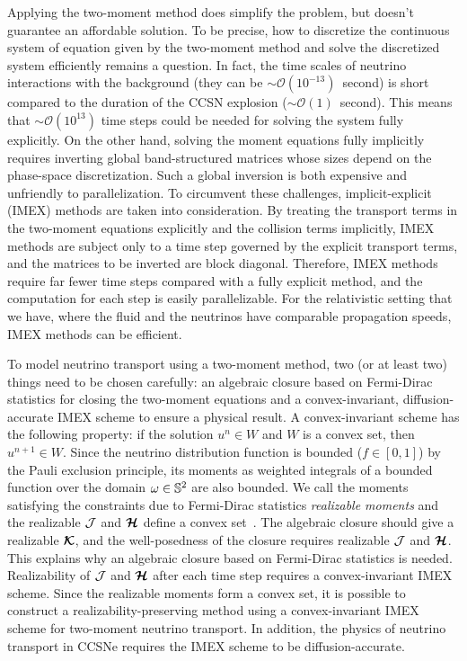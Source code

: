 Applying the two-moment method does simplify the problem, but doesn't guarantee an affordable solution.
To be precise, how to discretize the continuous system of equation given by the two-moment method and solve the discretized system efficiently remains a question.
In fact, the time scales of neutrino interactions with the background (they can be $\sim\mathcal{O}(10^{-13})$~second) is short compared to the duration of the CCSN explosion ($\sim\mathcal{O}(1)$~second).  
This means that $\sim\mathcal{O}(10^{13})$ time steps could be needed for solving the system fully explicitly. 
On the other hand, solving the moment equations fully implicitly requires inverting global band-structured matrices whose sizes depend on the phase-space discretization.
Such a global inversion is both expensive and unfriendly to parallelization.
To circumvent these challenges, implicit-explicit (IMEX) methods are taken into consideration.
By treating the transport terms in the two-moment equations explicitly and the collision terms implicitly, IMEX methods are subject only to a time step governed by the explicit transport terms, and the matrices to be inverted are block diagonal.
Therefore, IMEX methods require far fewer time steps compared with a fully explicit method, and the computation for each step is easily parallelizable.
For the relativistic setting that we have, where the fluid and the neutrinos have comparable propagation speeds, IMEX methods can be efficient.

To model neutrino transport using a two-moment method, two (or at least two) things need to be chosen carefully: an algebraic closure based on Fermi-Dirac statistics for closing the two-moment equations and a convex-invariant, diffusion-accurate IMEX scheme to ensure a physical result.
A convex-invariant scheme has the following property: if the solution $u^{n}\in W$ and $W$ is a convex set, then $u^{n+1}\in W$.
Since the neutrino distribution function is bounded ($f\in[0,1]$) by the Pauli exclusion principle, its moments as weighted integrals of a bounded function over the domain $\omega\in\mathbb{S}^{2}$ are also bounded.
We call the moments satisfying the constraints due to Fermi-Dirac statistics \textit{realizable moments} and the realizable $\mathcal{J}$ and $\boldsymbol{\mathcal{H}}$ define a convex set~\cite{chu_etal_2018}.
The algebraic closure should give a realizable $\boldsymbol{\mathcal{K}}$, and the well-posedness of the closure requires realizable $\mathcal{J}$ and $\boldsymbol{\mathcal{H}}$.
This explains why an algebraic closure based on Fermi-Dirac statistics is needed.
Realizability of $\mathcal{J}$ and $\boldsymbol{\mathcal{H}}$ after each time step requires a convex-invariant IMEX scheme.
Since the realizable moments form a convex set, it is possible to construct a realizability-preserving method using a convex-invariant IMEX scheme for two-moment neutrino transport.
In addition, the physics of neutrino transport in CCSNe requires the IMEX scheme to be diffusion-accurate.

